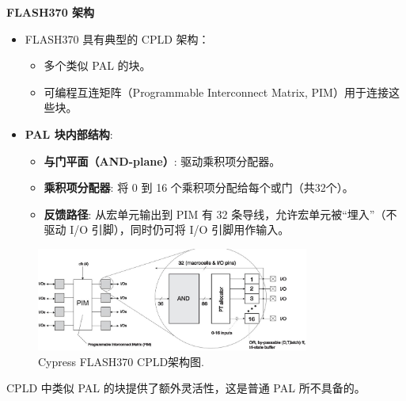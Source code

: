\begin{frame}[allowframebreaks]{\textbf{FLASH370 架构}}
    \begin{itemize}
    \tightlist
    \item
    FLASH370 具有典型的 CPLD 架构：

    \begin{itemize}
    \tightlist
    \item
        多个类似 PAL 的块。
    \item
        可编程互连矩阵（Programmable Interconnect Matrix,
        PIM）用于连接这些块。
    \end{itemize}
    \item
    \textbf{PAL 块内部结构}:

    \begin{itemize}
    \tightlist
    \item
        \textbf{与门平面（AND-plane）}: 驱动乘积项分配器。
    \item
        \textbf{乘积项分配器}: 将 0 到 16
        个乘积项分配给每个或门（共32个）。
    \item
        \textbf{反馈路径}: 从宏单元输出到 PIM 有 32
        条导线，允许宏单元被``埋入''（不驱动 I/O 引脚），同时仍可将 I/O
        引脚用作输入。   
    \end{itemize}
    \end{itemize}

\begin{figure}
    \centering
    \includegraphics[width=0.8\textwidth]{img1/cypress.jpeg}
    \caption{Cypress FLASH370 CPLD架构图.}
\end{figure}
CPLD 中类似 PAL 的块提供了额外灵活性，这是普通 PAL 所不具备的。
\end{frame}


